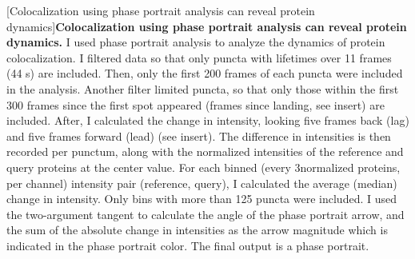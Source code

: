 \begin{centering}
[Colocalization using phase portrait analysis can reveal protein dynamics]{\textbf{Colocalization using phase portrait analysis can reveal protein dynamics.} I used phase portrait analysis to analyze the dynamics of protein colocalization. I filtered data so that only puncta with lifetimes over 11 frames (44 s) are included. Then, only the first 200 frames of each puncta were included in the analysis. Another filter limited puncta, so that only those within the first 300 frames since the first spot appeared (frames since landing, see insert) are included. After, I calculated the change in intensity, looking five frames back (lag) and five frames forward (lead) (see insert). The difference in intensities is then recorded per punctum, along with the normalized intensities of the reference and query proteins at the center value. For each binned (every 3\times normalized proteins, per channel) intensity pair (reference, query), I calculated the average (median) change in intensity. Only bins with more than 125 puncta were included. I used the two-argument tangent to calculate the angle of the phase portrait arrow, and the sum of the absolute change in intensities as the arrow magnitude which is indicated in the phase portrait color. The final output is a phase portrait.}
\label{m:6}
\end{centering}

